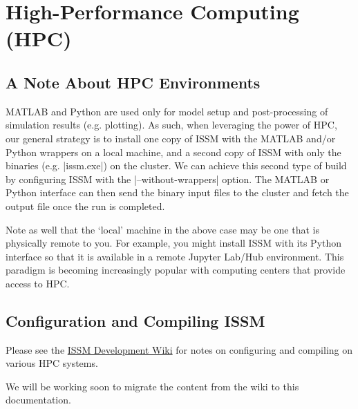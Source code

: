 
\section{High-Performance Computing (HPC)} \label{sec:installation-hpc}
\subsection{A Note About HPC Environments}
MATLAB and Python are used only for model setup and post-processing of simulation results (e.g. plotting). As such, when leveraging the power of HPC, our general strategy is to install one copy of ISSM with the MATLAB and/or Python wrappers on a local machine, and a second copy of ISSM with only the binaries (e.g. \lstinlinebg|issm.exe|) on the cluster. We can achieve this second type of build by configuring ISSM with the \lstinlinebg|--without-wrappers| option. The MATLAB or Python interface can then send the binary input files to the cluster and fetch the output file once the run is completed.

Note as well that the `local' machine in the above case may be one that is physically remote to you. For example, you might install ISSM with its Python interface so that it is available in a remote Jupyter Lab/Hub environment. This paradigm is becoming increasingly popular with computing centers that provide access to HPC.

\subsection{Configuration and Compiling ISSM}
Please see the \href{https://issm.ess.uci.edu/trac/issm/wiki}{ISSM Development Wiki} for notes on configuring and compiling on various HPC systems.

We will be working soon to migrate the content from the wiki to this documentation.

\clearpage %
